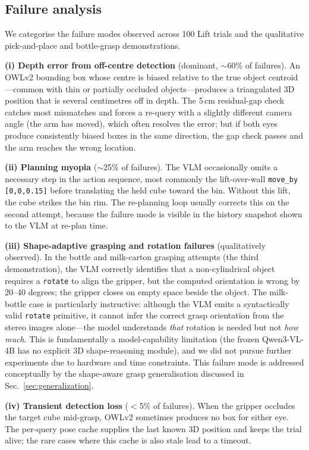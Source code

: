 \documentclass[conference]{IEEEtran}
\begin{document}
\subsection{Failure analysis}
\label{sec:failure}

We categorise the failure modes observed across 100 Lift trials and the qualitative pick-and-place and bottle-grasp demonstrations.

\textbf{(i) Depth error from off-centre detection} (dominant, $\sim$60\% of failures). An OWLv2 bounding box whose centre is biased relative to the true object centroid---common with thin or partially occluded objects---produces a triangulated 3D position that is several centimetres off in depth. The 5\,cm residual-gap check catches most mismatches and forces a re-query with a slightly different camera angle (the arm has moved), which often resolves the error; but if both eyes produce consistently biased boxes in the same direction, the gap check passes and the arm reaches the wrong location.

\textbf{(ii) Planning myopia} ($\sim$25\% of failures). The VLM occasionally omits a necessary step in the action sequence, most commonly the lift-over-wall \texttt{move\_by [0,0,0.15]} before translating the held cube toward the bin. Without this lift, the cube strikes the bin rim. The re-planning loop usually corrects this on the second attempt, because the failure mode is visible in the history snapshot shown to the VLM at re-plan time.

\textbf{(iii) Shape-adaptive grasping and rotation failures} (qualitatively observed). In the bottle and milk-carton grasping attempts (the third demonstration), the VLM correctly identifies that a non-cylindrical object requires a \texttt{rotate} to align the gripper, but the computed orientation is wrong by 20--40 degrees; the gripper closes on empty space beside the object. The milk-bottle case is particularly instructive: although the VLM emits a syntactically valid \texttt{rotate} primitive, it cannot infer the correct grasp orientation from the stereo images alone---the model understands \emph{that} rotation is needed but not \emph{how much}. This is fundamentally a model-capability limitation (the frozen Qwen3-VL-4B has no explicit 3D shape-reasoning module), and we did not pursue further experiments due to hardware and time constraints. This failure mode is addressed conceptually by the shape-aware grasp generalisation discussed in Sec.~\ref{sec:generalization}.

\textbf{(iv) Transient detection loss} ($<$5\% of failures). When the gripper occludes the target cube mid-grasp, OWLv2 sometimes produces no box for either eye. The per-query pose cache supplies the last known 3D position and keeps the trial alive; the rare cases where this cache is also stale lead to a timeout.
\end{document}
